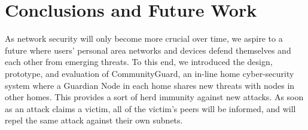 \section{Conclusions and Future Work}
\label{sec:concl}

As network security will only become more crucial over time, we aspire to a future where users' personal area networks and devices defend themselves and each other from emerging threats. To this end, we introduced the design, prototype, and evaluation of CommunityGuard, an in-line home cyber-security system where a Guardian Node in each home shares new threats with nodes in other homes. This provides a sort of herd immunity against new attacks. As soon as an attack claims a victim, all of the victim's peers will be informed, and will repel the same attack against their own subnets. 


%
%


